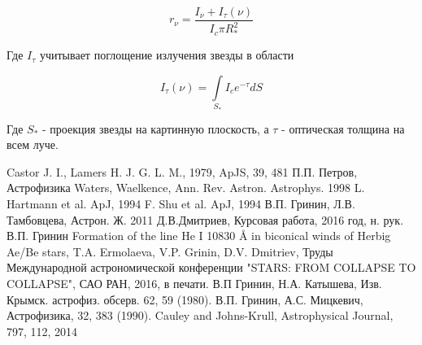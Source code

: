 \documentclass{article}
\begin{document}
\begin{equation}
r_{\nu} = \frac{I_\nu + I_{\tau}(\nu)}{I_c \pi R_\ast^2}
\end{equation}

Где $I_{\tau}$ учитывает поглощение излучения звезды в области

\begin{equation}
I_{\tau}(\nu) = \int \limits_{S_\ast} I_c e^{-\tau} dS
\end{equation}

Где $S_\ast$ - проекция звезды на картинную плоскость, а $\tau$ - оптическая толщина на всем луче.

\begin{thebibliography}{99}
 Castor J. I., Lamers H. J. G. L. M., 1979, ApJS, 39, 481
 П.П. Петров, Астрофизика
 Waters, Waelkence, Ann. Rev. Astron. Astrophys. 1998 
 L. Hartmann et al. ApJ, 1994
 F. Shu et al. ApJ, 1994
 В.П. Гринин, Л.В. Тамбовцева, Астрон. Ж. 2011
 Д.В.Дмитриев, Курсовая работа, 2016 год, н. рук. В.П. Гринин
 Formation of the line He I 10830 {\AA} in biconical winds of Herbig Ae/Be stars, T.A. Ermolaeva, V.P. Grinin, D.V. Dmitriev, Труды Международной астрономической конференции "STARS: FROM COLLAPSE TO COLLAPSE", САО РАН, 2016, в печати. 
 В.П Гринин, Н.А. Катышева, Изв. Крымск. астрофиз. обсерв. 62, 59 (1980).
 В.П. Гринин, А.С. Мицкевич, Астрофизика, 32, 383 (1990).
 Cauley and Johns-Krull, Astrophysical Journal, 797, 112, 2014

\end{thebibliography}
\end{document}
